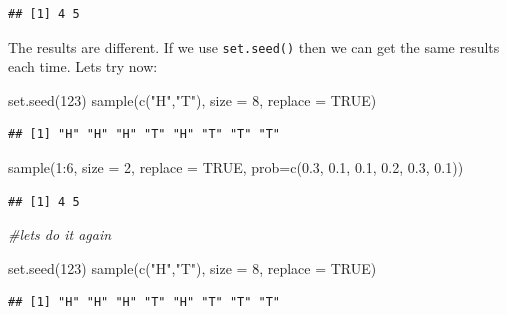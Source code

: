 \documentclass[
]{book}
\newenvironment{Shaded}{\begin{snugshade}}{\end{snugshade}}
\newcommand{\AttributeTok}[1]{\textcolor[rgb]{0.77,0.63,0.00}{#1}}
\newcommand{\CommentTok}[1]{\textcolor[rgb]{0.56,0.35,0.01}{\textit{#1}}}
\newcommand{\ConstantTok}[1]{\textcolor[rgb]{0.00,0.00,0.00}{#1}}
\newcommand{\DecValTok}[1]{\textcolor[rgb]{0.00,0.00,0.81}{#1}}
\newcommand{\FloatTok}[1]{\textcolor[rgb]{0.00,0.00,0.81}{#1}}
\newcommand{\FunctionTok}[1]{\textcolor[rgb]{0.00,0.00,0.00}{#1}}
\newcommand{\NormalTok}[1]{#1}
\newcommand{\SpecialCharTok}[1]{\textcolor[rgb]{0.00,0.00,0.00}{#1}}
\newcommand{\StringTok}[1]{\textcolor[rgb]{0.31,0.60,0.02}{#1}}
\begin{document}
\begin{verbatim}
## [1] 4 5
\end{verbatim}

The results are different. If we use \texttt{set.seed()} then we can get the same results each time. Lets try now:

\begin{Shaded}
\begin{Highlighting}[]
\FunctionTok{set.seed}\NormalTok{(}\DecValTok{123}\NormalTok{)}
\FunctionTok{sample}\NormalTok{(}\FunctionTok{c}\NormalTok{(}\StringTok{"H"}\NormalTok{,}\StringTok{"T"}\NormalTok{), }\AttributeTok{size =} \DecValTok{8}\NormalTok{, }\AttributeTok{replace =} \ConstantTok{TRUE}\NormalTok{)  }
\end{Highlighting}
\end{Shaded}

\begin{verbatim}
## [1] "H" "H" "H" "T" "H" "T" "T" "T"
\end{verbatim}

\begin{Shaded}
\begin{Highlighting}[]
\FunctionTok{sample}\NormalTok{(}\DecValTok{1}\SpecialCharTok{:}\DecValTok{6}\NormalTok{, }\AttributeTok{size =} \DecValTok{2}\NormalTok{, }\AttributeTok{replace =} \ConstantTok{TRUE}\NormalTok{, }\AttributeTok{prob=}\FunctionTok{c}\NormalTok{(}\FloatTok{0.3}\NormalTok{, }\FloatTok{0.1}\NormalTok{, }\FloatTok{0.1}\NormalTok{, }\FloatTok{0.2}\NormalTok{, }\FloatTok{0.3}\NormalTok{, }\FloatTok{0.1}\NormalTok{))}
\end{Highlighting}
\end{Shaded}

\begin{verbatim}
## [1] 4 5
\end{verbatim}

\begin{Shaded}
\begin{Highlighting}[]
\CommentTok{\#let\textquotesingle{}s do it again}

\FunctionTok{set.seed}\NormalTok{(}\DecValTok{123}\NormalTok{)}
\FunctionTok{sample}\NormalTok{(}\FunctionTok{c}\NormalTok{(}\StringTok{"H"}\NormalTok{,}\StringTok{"T"}\NormalTok{), }\AttributeTok{size =} \DecValTok{8}\NormalTok{, }\AttributeTok{replace =} \ConstantTok{TRUE}\NormalTok{) }
\end{Highlighting}
\end{Shaded}

\begin{verbatim}
## [1] "H" "H" "H" "T" "H" "T" "T" "T"
\end{verbatim}
\end{document}
